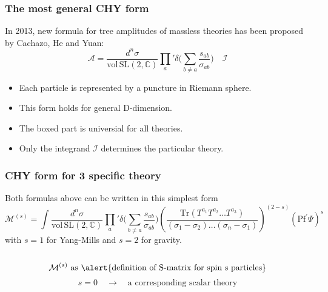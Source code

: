 \documentclass{beamer}
\begin{document}
\begin{frame}
    \frametitle{The most general CHY form}
    In 2013, new formula for tree amplitudes of massless theories has been proposed by Cachazo, He and Yuan:
    \begin{equation*}
        \mathcal{A}=\boxed{\frac{d^n\sigma}{\mathrm{vol\,SL}(2,\mathbb{C})}\prod_a{'}\delta\bigg(\sum_{b\neq a}\frac{s_{ab}}{\sigma_{ab}}\bigg)}\quad \mathcal{I}
    \end{equation*}
    \begin{itemize}
        \item Each particle is represented by a puncture in Riemann sphere.
        \item This form holds for general D-dimension.
        \item The boxed part is \alert{universial for all theories}.
        \item Only the integrand $\mathcal{I}$ determines the particular theory.
    \end{itemize}
\end{frame}
\begin{frame}
    \frametitle{CHY form for 3 specific theory}
    Both formulas above can be written in this simplest form %
    \alert{
        \begin{equation*}
            \!\!\!\!\mathcal{M}^{(s)}\!=\!\!\!\int\frac{d^n\sigma}{\mathrm{vol\,SL}(2,\mathbb{C})}\prod_a{'}\delta\bigg(\sum_{b\neq a}\frac{s_{ab}}{\sigma_{ab}}\bigg)
            \!\!\!\left(\frac{\mathrm{Tr}(T^{a_1}T^{a_2}\dots T^{a_3})}{(\sigma_1-\sigma_2)\dots (\sigma_n-\sigma_1)}\right)^{(2-s)}\!{(\mathrm{Pf}^\prime\Psi)}^s
        \end{equation*}}
    with $s=1$ for Yang-Mills and $s=2$ for gravity.
    \\ \hspace*{\fill}\\
    \pause
    \begin{equation*}
        \mathcal{M}^{(s)} \text{ as \alert{definition of S-matrix for spin s particles}}
    \end{equation*}
    \begin{equation*}
        s=0\quad\to \quad \text{a corresponding scalar theory}
    \end{equation*}
\end{frame}
\end{document}
